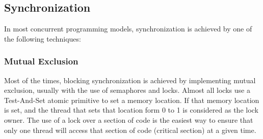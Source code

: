 

 
%
%
%
%
%

\subsection{Synchronization}
In most concurrent programming models, synchronization is achieved by one of the following techniques:

\subsubsection{Mutual Exclusion}

Most of the times, blocking synchronization is achieved  by implementing  mutual exclusion, usually with the use of semaphores and locks. Almost all locks use a Test-And-Set atomic primitive to set a memory location. If that memory location is set,  and the thread that sets that location form 0 to 1 is considered as the lock owner. The use of a lock over a section of code is the easiest way to ensure that only one thread will access that section of code (critical section) at a given time.

